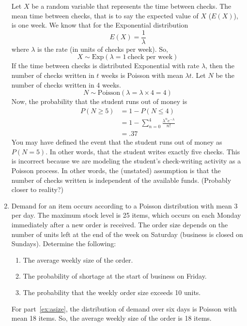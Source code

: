 \begin{enumerate}
\begin{solution}
\bs
Let $X$ be a random variable that represents the time between
checks. The mean time between checks, that is to say the
expected value of $X$ ($E(X)$), is one week. We know that for
the Exponential distribution
\[ E(X) = \frac{1}{\lambda} \]
where $\lambda$ is the rate (in units of checks
per week). So,
\[ X \sim \text{Exp}(\lambda = 1~\text{check per week}) \]
If the time between checks is distributed Exponential with
rate $\lambda$, then the number of checks written in $t$ weeks
is Poisson with mean $\lambda t$. Let $N$ be the number of checks
written in 4 weeks.
\[ N \sim \text{Poisson}(\lambda = \lambda \times 4 = 4) \]
Now, the probability that the student runs out of money is
\begin{align*}
  P(N \geq 5) &= 1 - P(N \leq 4) \\
              &= 1 - \sum_{n=0}^{4} \frac{\lambda^n e^{-\lambda}}{n!}\\
              &= .37
\end{align*}
You may have defined the event that the student runs out of money as
$P(N = 5)$. In other words, that the student writes exactly five
checks.  This is incorrect because we are modeling the student's
check-writing activity as a Poisson process. In other words, the
(unstated) assumption is that the number of checks written is
independent of the available funds. (Probably closer to reality?)
\end{solution}

\item 
Demand for an item occurs according to a Poisson distribution with
mean 3 per day. The maximum stock level is 25 items, which occurs on
each Monday immediately after a new order is received. The order size
depends on the number of units left at the end of the week on Saturday
(business is closed on Sundays). Determine the following:
\begin{enumerate}
\item The average weekly size of the order. \label{ex:asize}
\item The probability of shortage at the start of business on Friday. \label{ex:pshort}
\item The probability that the weekly order size exceeds 10 units. \label{ex:pex}
\end{enumerate}

\begin{solution}
\bs
For part~\ref{ex:asize}, the distribution of demand over six days is
Poisson with mean 18 items. So, the average weekly size
of the order is 18 items.


\end{solution}
\end{enumerate}
